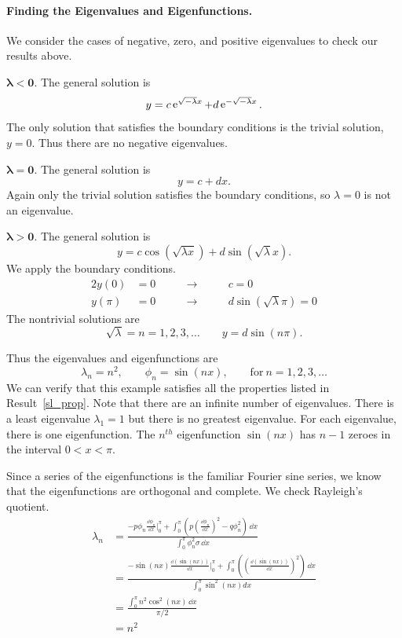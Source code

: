 \begin{Example}
  \paragraph{Finding the Eigenvalues and Eigenfunctions.}
  We consider the cases of negative, zero, and positive eigenvalues to 
  check our results above.
  \begin{description}
  \item{$\mathbf{\boldsymbol{\lambda} \boldsymbol{<} 0}$.}
    The general solution is
    \[ 
    y = c \mathop{\mathrm{e}}\nolimits^{\sqrt{-\lambda} x} + d \mathop{\mathrm{e}}\nolimits^{- \sqrt{-\lambda} x}.
    \]
    The only solution that satisfies the boundary conditions is the trivial
    solution, $y = 0$.  Thus there are no negative eigenvalues.
  \item{$\mathbf{\boldsymbol{\lambda} \boldsymbol{=} 0}$.}
    The general solution is
    \[ 
    y = c + d x.
    \]
    Again only the trivial solution satisfies the boundary conditions, so
    $\lambda = 0$ is not an eigenvalue.
  \item{$\mathbf{\boldsymbol{\lambda} \boldsymbol{>} 0}$.}
    The general solution is
    \[ 
    y = c \cos(\sqrt{\lambda x}) + d \sin(\sqrt{\lambda} x).
    \]
    We apply the boundary conditions.
    \begin{alignat*}{2}
      y(0) &= 0 \qquad &\to \qquad &c = 0 \\
      y(\pi) &= 0 \qquad &\to \qquad &d \sin(\sqrt{\lambda} \pi) = 0 
    \end{alignat*}
    The nontrivial solutions are
    \[ 
    \sqrt{\lambda} = n = 1, 2, 3, \ldots \qquad y = d \sin(n \pi).
    \]
  \end{description}
  Thus the eigenvalues and eigenfunctions are
  \[ 
  \lambda_n = n^2, \qquad \phi_n = \sin(n x), \qquad \mathrm{for}\ n = 1,2,3,\ldots 
  \]
  We can verify that this example satisfies all the properties listed
  in Result~\ref{sl_prop}. 
  Note that there are an infinite number of eigenvalues.  There is a least
  eigenvalue $\lambda_1 = 1$ but there is no greatest eigenvalue. For
  each eigenvalue, there is one eigenfunction. The $n^{t h}$ eigenfunction
  $\sin(n x)$ has $n - 1$ zeroes in the interval $0 < x < \pi$.

  Since a series of the eigenfunctions is the familiar Fourier sine series,
  we know that the eigenfunctions are orthogonal and complete.  We check
  Rayleigh's quotient.
  \begin{align*}
    \lambda_n   
    &= \frac{ - p \phi_n \frac{\dd \phi_n}{\dd x} \Big|_0^\pi
      + { \displaystyle \int_0^\pi }
      \left( p \left(\frac{\dd \phi_n}{\dd x}\right)^2-q\phi_n^2
      \right)\,\dd x}
    {\int_0^\pi \phi_n^2 \sigma\,\dd x} 
    \\
    &= \frac{ - \sin(n x) \frac{\dd (\sin(n x))}{\dd x} \Big|_0^\pi
      + { \displaystyle \int_0^\pi }
      \left( \left(\frac{\dd (\sin(n x))}{\dd x}\right)^2 \right)\,\dd x}
    {\int_0^\pi \sin^2(n x) d x} 
    \\
    &= \frac{\int_0^\pi n^2 \cos^2(n x)\,\dd x}{\pi/2} 
    \\
    &= n^2
  \end{align*}
\end{Example}
